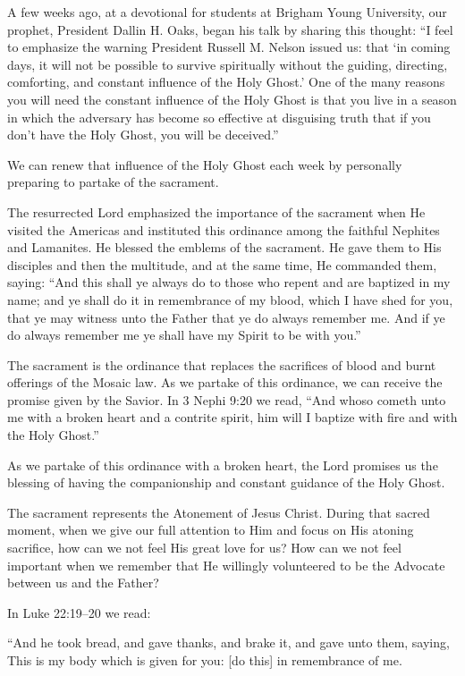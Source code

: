 \documentclass[letterpaper, 11pt]{report}
\begin{document}
A few weeks ago, at a devotional for students at Brigham Young University, our prophet, President Dallin H. Oaks, began his talk by sharing this thought: “I feel to emphasize the warning President Russell M. Nelson issued us: that ‘in coming days, it will not be possible to survive spiritually without the guiding, directing, comforting, and constant influence of the Holy Ghost.’ One of the many reasons you will need the constant influence of the Holy Ghost is that you live in a season in which the adversary has become so effective at disguising truth that if you don’t have the Holy Ghost, you will be deceived.”

We can renew that influence of the Holy Ghost each week by personally preparing to partake of the sacrament.

The resurrected Lord emphasized the importance of the sacrament when He visited the Americas and instituted this ordinance among the faithful Nephites and Lamanites. He blessed the emblems of the sacrament. He gave them to His disciples and then the multitude, and at the same time, He commanded them, saying: “And this shall ye always do to those who repent and are baptized in my name; and ye shall do it in remembrance of my blood, which I have shed for you, that ye may witness unto the Father that ye do always remember me. And if ye do always remember me ye shall have my Spirit to be with you.”

The sacrament is the ordinance that replaces the sacrifices of blood and burnt offerings of the Mosaic law. As we partake of this ordinance, we can receive the promise given by the Savior. In 3 Nephi 9:20 we read, “And whoso cometh unto me with a broken heart and a contrite spirit, him will I baptize with fire and with the Holy Ghost.”

As we partake of this ordinance with a broken heart, the Lord promises us the blessing of having the companionship and constant guidance of the Holy Ghost.

The sacrament represents the Atonement of Jesus Christ. During that sacred moment, when we give our full attention to Him and focus on His atoning sacrifice, how can we not feel His great love for us? How can we not feel important when we remember that He willingly volunteered to be the Advocate between us and the Father?

In Luke 22:19–20 we read:

“And he took bread, and gave thanks, and brake it, and gave unto them, saying, This is my body which is given for you: [do this] in remembrance of me.
\end{document}

